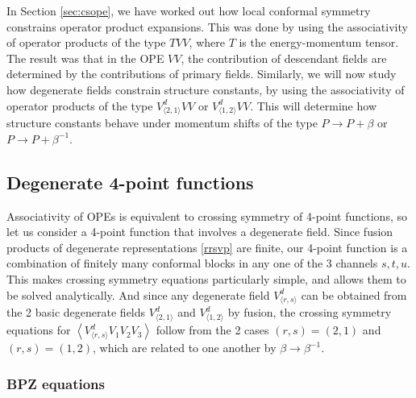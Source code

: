 \documentclass[12pt, a4paper]{article}
\theoremstyle{break}
\begin{document}
In Section \ref{sec:csope}, we have worked out how local conformal symmetry constrains operator product expansions. This was done by using the associativity of operator products of the type $TVV$, where $T$ is the energy-momentum tensor. The result was that in the OPE $VV$, the contribution of descendant fields are determined by the contributions of primary fields. Similarly, we will now study how degenerate fields constrain structure constants, by using the associativity of 
operator products of the type $V^d_{\langle 2,1\rangle}VV$ or $V^d_{\langle 1,2\rangle}VV$.  
This will determine how structure constants behave under momentum shifts of the type $P\to P+ \beta$ or $P\to P+ \beta^{-1}$. 

\subsection{Degenerate 4-point functions}

Associativity of OPEs is equivalent to crossing symmetry of 4-point functions, so let us consider a 4-point function that involves a degenerate field. Since fusion products of degenerate representations \eqref{rrsvp} are finite, our 4-point function is a combination of finitely many conformal blocks in any one of the 3 channels $s,t,u$. This makes crossing symmetry equations particularly simple, and allows them to be solved analytically. 
And since any degenerate field $V^d_{\langle r,s\rangle}$ can be obtained from the 2 basic degenerate fields $V^d_{\langle 2,1\rangle}$ and $V^d_{\langle 1,2\rangle}$ by fusion, the crossing symmetry equations for $\left<V^d_{\langle r,s\rangle}V_1V_2V_3\right>$ follow from the 2 cases $(r,s)=(2,1)$ and $(r,s)=(1,2)$, which are related to one another by $\beta\to \beta^{-1}$.  

\subsubsection{BPZ equations}
\end{document}
